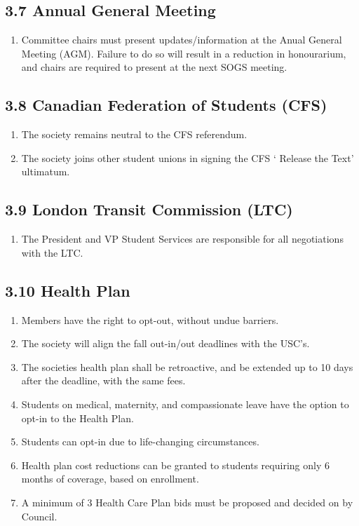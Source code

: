 \subsection{3.7  Annual General Meeting}
\begin{enumerate}
\item Committee chairs must present updates/information at the Anual General Meeting (AGM). Failure to do so will result in a reduction in honourarium, and chairs are required to present at the next SOGS meeting.
\end{enumerate}

\subsection{3.8 Canadian Federation of Students (CFS)}
\begin{enumerate}
\item  	The society remains neutral to the CFS referendum.
\item 	The society joins other student unions in signing the CFS ‘ Release the Text’ ultimatum. 
\end{enumerate}

\subsection{3.9 London Transit Commission (LTC)}
\begin{enumerate}
\item  	 	The President and VP Student Services are responsible for all negotiations with the LTC. 
\end{enumerate}

\subsection{3.10 Health Plan}
\begin{enumerate}
\item  	Members have the right to opt-out, without undue barriers.
\item	The society will align the fall out-in/out deadlines with the USC’s.
\item	The societies health plan shall be retroactive, and be extended up to 10 days after the deadline, with the same fees.
\item	Students on medical, maternity, and compassionate leave have the option to opt-in to the Health Plan.
\item	Students can opt-in due to life-changing circumstances. 
\item	Health plan cost reductions can be granted to students requiring only 6 months of coverage, based on enrollment.
\item	A minimum of 3 Health Care Plan bids must be proposed and decided on by Council.
\end{enumerate}


